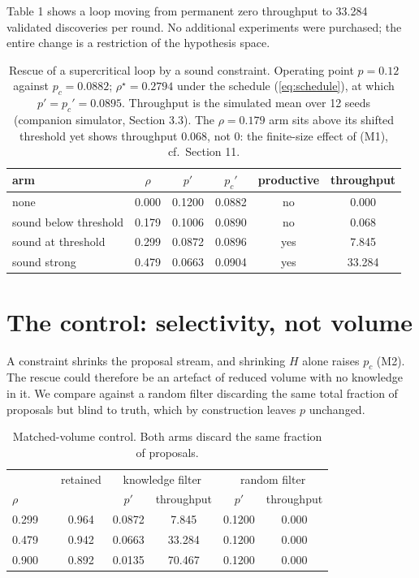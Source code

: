 \documentclass[11pt]{article}
\begin{document}
Table 1 shows a loop moving from permanent zero throughput to 33.284
validated discoveries per round. No additional experiments were purchased;
the entire change is a restriction of the hypothesis space.

\begin{table}[t]
\centering
\caption{Rescue of a supercritical loop by a sound constraint. Operating
point $p = 0.12$ against $p_c = 0.0882$; $\rho^\star = 0.2794$ under the
schedule (\ref{eq:schedule}), at which $p' = p_c' = 0.0895$. Throughput is
the simulated mean over 12 seeds (companion simulator, Section 3.3). The
$\rho = 0.179$ arm sits above its shifted threshold yet shows throughput
$0.068$, not $0$: the finite-size effect of (M1), cf.\ Section 11.}
\begin{tabular}{lccccc}
\toprule
arm & $\rho$ & $p'$ & $p_c'$ & productive & throughput \\
\midrule
none & 0.000 & 0.1200 & 0.0882 & no & 0.000 \\
sound below threshold & 0.179 & 0.1006 & 0.0890 & no & 0.068 \\
sound at threshold & 0.299 & 0.0872 & 0.0896 & yes & 7.845 \\
sound strong & 0.479 & 0.0663 & 0.0904 & yes & 33.284 \\
\bottomrule
\end{tabular}
\end{table}

\section{The control: selectivity, not volume}

A constraint shrinks the proposal stream, and shrinking $H$ alone raises
$p_c$ (M2). The rescue could therefore be an artefact of reduced volume with
no knowledge in it. We compare against a random filter discarding the same
total fraction of proposals but blind to truth, which by construction leaves
$p$ unchanged.

\begin{table}[t]
\centering
\caption{Matched-volume control. Both arms discard the same fraction of
proposals.}
\begin{tabular}{lcccccc}
\toprule
& & retained & \multicolumn{2}{c}{knowledge filter} &
\multicolumn{2}{c}{random filter} \\
$\rho$ & & & $p'$ & throughput & $p'$ & throughput \\
\midrule
0.299 & & 0.964 & 0.0872 & 7.845 & 0.1200 & 0.000 \\
0.479 & & 0.942 & 0.0663 & 33.284 & 0.1200 & 0.000 \\
0.900 & & 0.892 & 0.0135 & 70.467 & 0.1200 & 0.000 \\
\bottomrule
\end{tabular}
\end{table}
\end{document}
